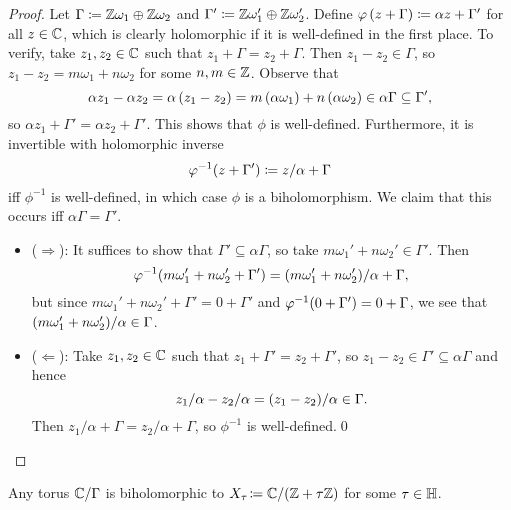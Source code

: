 \documentclass[../Moduli_Spaces_of_Riemann_Surfaces.tex]{subfiles}
\begin{document}
    \begin{proof}
        Let $\Gamma\coloneqq\mathbb{Z}\omega_1\oplus\mathbb{Z}\omega_2$ and $\Gamma'\coloneqq\mathbb{Z}\omega_1'\oplus\mathbb{Z}\omega_2'$. Define $\varphi\left(z+\Gamma\right)\coloneqq\alpha z+\Gamma'$ for all $z\in\mathbb{C}$, which is clearly holomorphic if it is well-defined in the first place. To verify, take $z_1,z_2\in\mathbb{C}$ such that $z_1+\Gamma=z_2+\Gamma$. Then $z_1-z_2\in\Gamma$, so $z_1-z_2=m\omega_1+n\omega_2$ for some $n,m\in\mathbb{Z}$. Observe that
        \begin{equation*}
            \alpha z_1-\alpha z_2=\alpha\left(z_1-z_2\right)=m\left(\alpha\omega_1\right)+n\left(\alpha\omega_2\right)\in\alpha\Gamma\subseteq\Gamma',
        \end{equation*}
        so $\alpha z_1+\Gamma'=\alpha z_2+\Gamma'$. This shows that $\phi$ is well-defined. Furthermore, it is invertible with holomorphic inverse
        \begin{equation*}
            \varphi^{-1}\!\left(z+\Gamma'\right)\coloneqq z/\alpha+\Gamma
        \end{equation*}
        iff $\phi^{-1}$ is well-defined, in which case $\phi$ is a biholomorphism. We claim that this occurs iff $\alpha\Gamma=\Gamma'$.
        \begin{itemize}
            \item ($\Rightarrow$): It suffices to show that $\Gamma'\subseteq\alpha\Gamma$, so take $m\omega_1'+n\omega_2'\in\Gamma'$. Then
                \begin{equation*}
                    \varphi^{-1}\!\left(m\omega_1'+n\omega_2'+\Gamma'\right)=\left(m\omega_1'+n\omega_2'\right)\!/\alpha+\Gamma,
                \end{equation*}
                but since $m\omega_1'+n\omega_2'+\Gamma'=0+\Gamma'$ and $\varphi^{-1}\!\left(0+\Gamma'\right)=0+\Gamma$, we see that $\left(m\omega_1'+n\omega_2'\right)\!/\alpha\in\Gamma$.
            \item ($\Leftarrow$): Take $z_1,z_2\in\mathbb{C}$ such that $z_1+\Gamma'=z_2+\Gamma'$, so $z_1-z_2\in\Gamma'\subseteq\alpha\Gamma$ and hence
                \begin{equation*}
                    z_1/\alpha-z_2/\alpha=\left(z_1-z_2\right)\!/\alpha\in\Gamma.
                \end{equation*}
                Then $z_1/\alpha+\Gamma=z_2/\alpha+\Gamma$, so $\phi^{-1}$ is well-defined.\qed
        \end{itemize}
    \end{proof}
    \begin{lemma}
        Any torus $\mathbb{C}/\Gamma$ is biholomorphic to $X_\tau\!\coloneqq\mathbb{C}/\!\left(\mathbb{Z}+\tau\mathbb{Z}\right)$ for some $\tau\in\mathbb{H}$.
    \end{lemma}\vspace{-0.08in}
\end{document}
